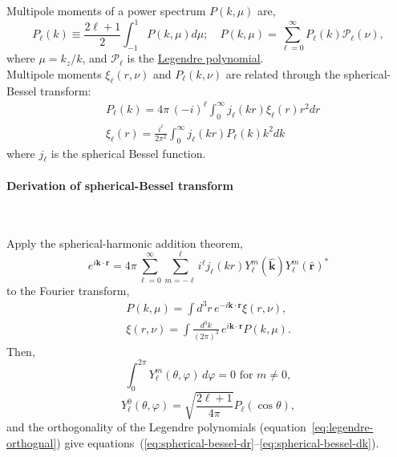 \documentclass[a4paper,11pt, fleqn]{article}
\begin{document}
Multipole moments of a power spectrum $P(k, \mu)$ are,
\begin{equation}
  P_\ell(k) \equiv \frac{2 \ell + 1}{2} \int_{-1}^1 P(k, \mu) d\mu;\quad
  P(k, \mu) = \sum_{\ell=0}^\infty P_\ell(k) \mathcal{P}_\ell(\nu),
\end{equation}
where $\mu = k_z/k$, and $\mathcal{P}_\ell$ is the \hyperref[sec:legendre]{Legendre polynomial}.\\

\vspace{5mm} Multipole moments $\xi_\ell(r, \nu)$ and $P_\ell(k, \nu)$
are related through the spherical-Bessel transform:
%
\begin{align}
  &P_\ell(k) = 4\pi \, (-i)^\ell \!\int_0^\infty \! j_\ell(kr) \xi_\ell(r) r^2 dr
  \label{eq:spherical-bessel-dr}\\
  &\xi_\ell(r) = \frac{i^\ell}{2\pi^2} \int_0^\infty \! j_\ell(kr) P_\ell(k) k^2 dk
  \label{eq:spherical-bessel-dk}
\end{align}
%
where $j_\ell$ is the spherical Bessel function.

\clearpage

\paragraph{Derivation of spherical-Bessel transform} \quad\\
\label{proof:multipole-transform}

\vspace{5mm}

Apply the spherical-harmonic addition theorem,
%
\begin{equation}
  e^{i\bm{k}\cdot\bm{r}} = 4\pi \sum_{\ell=0}^\infty \sum_{m=-\ell}^\ell
  i^\ell j_\ell(kr) Y_\ell^m(\hat{\bm{k}}) Y_\ell^m(\hat{\bm{r}})^*
\end{equation}
%
to the Fourier transform,
%
\begin{align}
  P(k, \mu) = \int \!\! d^3 r \, e^{-i\bm{k}\cdot\bm{r}} \xi(r, \nu),\\
  \xi(r, \nu) = \int \!\! \frac{d^3 k}{(2\pi)^3} \, e^{i\bm{k}\cdot\bm{r}} P(k, \mu).
\end{align}
%
Then,
%
\begin{equation}
  \int_0^{2\pi} \! Y_\ell^m(\theta, \varphi) \, d \varphi = 0
  \mbox{ for $m \neq 0$},
\end{equation}
%
\begin{equation}
  Y_\ell^0(\theta, \varphi) = \sqrt{\frac{2\ell + 1}{4\pi}} P_\ell(\cos\theta),
\end{equation}
%
and the orthogonality of the Legendre polynomials
(equation~\ref{eq:legendre-orthognal}) give
equations~(\ref{eq:spherical-bessel-dr}--\ref{eq:spherical-bessel-dk}).
\end{document}
